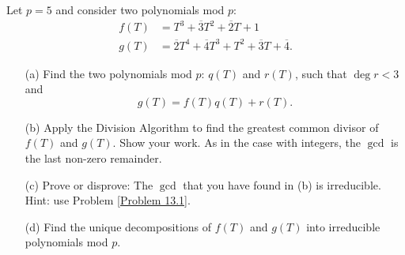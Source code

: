 \vspace*{0.1in}

\begin{problem}\label{Problem 13.2}
Let $p = 5$ and consider two polynomials mod $p$:
\begin{align*}
f(T) &= T^3 + \overline{3}T^2 + \overline{2}T + 1\\[0.5em]
g(T) &= \overline{2}T^4 + \overline{4}T^3 + T^2 + \overline{3}T + \overline{4}.
\end{align*}
\begin{itemize}
\item[(a)] Find the two polynomials mod $p$: $q(T)$ and $r(T)$, such that $\deg r < 3$ and
\[g(T) = f(T)q(T) + r(T).\]
\item[(b)] Apply the Division Algorithm to find the greatest common divisor of $f(T)$ and $g(T)$. Show your work. As in the case with integers, the $\gcd$ is the last non-zero remainder.
\item[(c)] Prove or disprove: The $\gcd$ that you have found in (b) is irreducible.\\[0.1em]
{\footnotesize Hint: use Problem \ref{Problem 13.1}.}
\item[(d)] Find the unique decompositions of $f(T)$ and $g(T)$ into irreducible polynomials mod $p$.
\end{itemize}
\end{problem}
